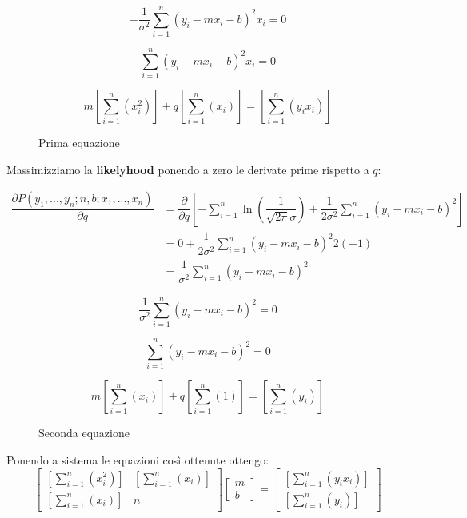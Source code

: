 \documentclass[\main/main.tex]{subfiles}
\begin{document}
\[
	-\dfrac{1}{\sigma^2} \sum_{i=1}^n \left(y_i - mx_i - b \right)^2  x_i = 0
\]

\[
	\sum_{i=1}^n \left(y_i - mx_i - b \right)^2  x_i = 0
\]

\begin{figure}[H]
\[
	m\left [ \sum_{i=1}^n \left(x_i^2 \right) \right ] + q \left [ \sum_{i=1}^n \left(x_i \right) \right ] = \left [ \sum_{i=1}^n \left(y_i x_i \right) \right ]
\]
\caption{Prima equazione}
\end{figure}

Massimizziamo la \textbf{likelyhood} ponendo a zero le derivate prime rispetto a $q$:

\begin{align}
	\dfrac{\partial P \left(y_1,...,y_n; n, b; x_1, ..., x_n \right)}{\partial q}  &= \dfrac{\partial}{\partial q} \left [ - \sum_{i=1}^n \ln
	 \left ( \dfrac{1}{\sqrt{2\pi}\sigma} \right )
	 + \dfrac{1}{2\sigma^2} \sum_{i=1}^n
		\left(y_i - mx_i - b \right)^2
	 	 \right ]\\
	 &= 0 + \dfrac{1}{2\sigma^2} \sum_{i=1}^n \left(y_i - mx_i - b \right)^2 2 (-1)\\
	 &= \dfrac{1}{\sigma^2} \sum_{i=1}^n \left(y_i - mx_i - b \right)^2
\end{align}

\[
	\dfrac{1}{\sigma^2} \sum_{i=1}^n \left(y_i - mx_i - b \right)^2  = 0
\]

\[
	\sum_{i=1}^n \left(y_i - mx_i - b \right)^2 = 0
\]

\begin{figure}[H]
\[
	m\left [ \sum_{i=1}^n \left(x_i \right) \right ] + q \left [ \sum_{i=1}^n \left(1 \right) \right ] = \left [ \sum_{i=1}^n \left(y_i \right) \right ]
\]
\caption{Seconda equazione}
\end{figure}

Ponendo a sistema le equazioni così ottenute ottengo:
\[
\begin{bmatrix}
	\left [ \sum_{i=1}^n \left(x_i^2 \right) \right ] &  \left [ \sum_{i=1}^n \left(x_i \right) \right ] \\
	\left [ \sum_{i=1}^n \left(x_i \right) \right ] & n
\end{bmatrix}
\begin{bmatrix}
m\\
b
\end{bmatrix}
= 
\begin{bmatrix}
	\left [ \sum_{i=1}^n \left(y_i x_i \right) \right ] \\
	\left [ \sum_{i=1}^n \left(y_i \right) \right ]
\end{bmatrix}
\]
\end{document}
